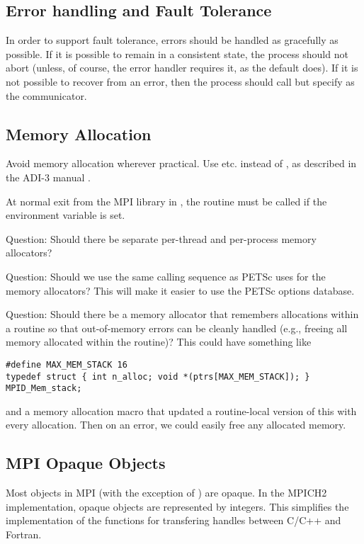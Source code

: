 \documentclass{article}
\begin{document}
\subsection{Error handling and Fault Tolerance}
In order to support fault tolerance, errors should be handled as
gracefully as possible.  If it is possible to remain in a consistent
state, the process should not abort (unless, of course, the error
handler requires it, as the default  does).  
If it is not possible to recover from an error, then the process
should call  but specify  as the
communicator.  

\subsection{Memory Allocation}
Avoid memory allocation wherever practical.  Use 
etc. instead of , as described in the ADI-3 manual
\cite{adi3man}. 

At normal exit from the MPI library in , the
routine  must be called if the environment variable
 is set.  

Question: Should there be separate per-thread and per-process memory
allocators? 

Question: Should we use the same calling sequence as PETSc uses for the memory
allocators?  This will make it easier to use the PETSc options database.

Question: Should there be a memory allocator that remembers allocations within
a routine so that out-of-memory errors can be cleanly handled (e.g., freeing
all memory allocated within the routine)?  This could have something like
\begin{verbatim}
#define MAX_MEM_STACK 16
typedef struct { int n_alloc; void *(ptrs[MAX_MEM_STACK]); } MPID_Mem_stack;
\end{verbatim}
and a memory allocation macro that updated a routine-local version of this
with every allocation.  Then on an error, we could easily free any allocated
memory.

\subsection{MPI Opaque Objects}

Most objects in MPI (with the exception of ) are
opaque.  In the MPICH2 implementation, opaque objects are represented
by integers.  This simplifies the implementation of the functions for
transfering handles between C/C++ and Fortran.  
\end{document}
